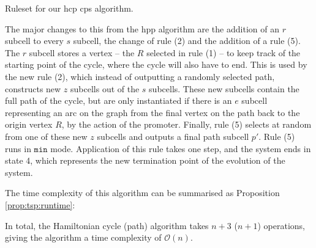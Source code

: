 \begin{cprulesetfloat}
    \begin{cpruleset}
        
        
        
        
        
        
    \end{cpruleset}
    \caption[Ruleset for the ]{\label{ruleset:tsp:hcp}Ruleset for our \gls{hcp} \gls{cps} algorithm.}
\end{cprulesetfloat}

The major changes to this from the \gls{hpp} algorithm are the addition of an \(r\) subcell to every \(s\) subcell, the change of rule (2) and the addition of a rule (5). The \(r\) subcell stores a vertex -- the \(R\) selected in rule (1) -- to keep track of the starting point of the cycle, where the cycle will also have to end.  This is used by the new rule (2), which instead of outputting a randomly selected path, constructs new \(z\) subcells out of the \(s\) subcells.  These new subcells contain the full path of the cycle, but are only instantiated if there is an \(e\) subcell representing an arc on the graph from the final vertex on the path back to the origin vertex \(R\), by the action of the promoter.  Finally, rule (5) selects at random from one of these new \(z\) subcells and outputs a final path subcell \(p'\).  Rule (5) runs in \(\mathtt{min}\) mode.  Application of this rule takes one step, and the system ends in state 4, which represents the new termination point of the evolution of the system.

The time complexity of this algorithm can be summarised as Proposition \ref{prop:tsp:runtime}:

\begin{proposition}
In total, the Hamiltonian cycle (path) algorithm takes \(n + 3\) (\(n + 1\)) operations, giving the algorithm a time complexity of \(\mathcal{O}(n)\).
\label{prop:tsp:runtime}
\end{proposition}